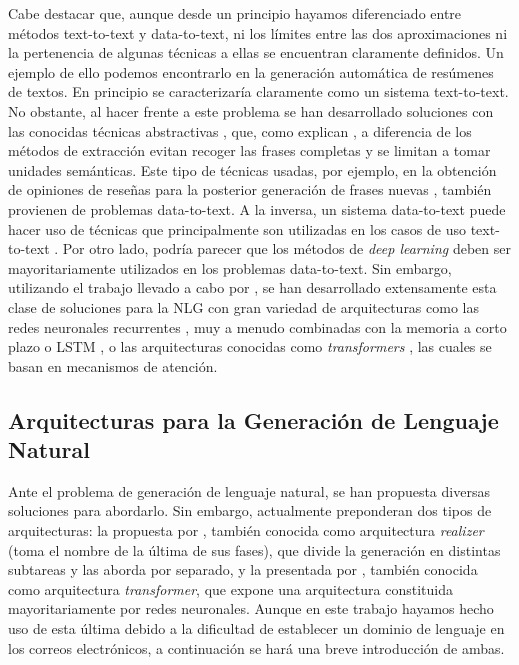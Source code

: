 Cabe destacar que, aunque desde un principio hayamos diferenciado entre métodos text-to-text y data-to-text, ni los límites entre las dos aproximaciones ni la pertenencia de algunas técnicas a ellas se encuentran claramente definidos. Un ejemplo de ello podemos encontrarlo en la generación automática de resúmenes de textos. En principio se caracterizaría claramente como un sistema text-to-text. No obstante, al hacer frente a este problema se han desarrollado soluciones con las conocidas técnicas abstractivas \citep{genest2011framework}, que, como explican \cite{hahn2000challenges}, a diferencia de los métodos de extracción evitan recoger las frases completas y se limitan a tomar unidades semánticas. Este tipo de técnicas usadas, por ejemplo, en la obtención de opiniones de reseñas para la posterior generación de frases nuevas \citep{labbe2012towards}, también provienen de problemas data-to-text. A la inversa, un sistema data-to-text puede hacer uso de técnicas que principalmente son utilizadas en los casos de uso text-to-text \citep{mcintyre2009learning, kondadadi2013statistical}. Por otro lado, podría parecer que los métodos de \textit{deep learning} \citep{goodfellow2016deep} deben ser mayoritariamente utilizados en los problemas data-to-text. Sin embargo, utilizando el trabajo llevado a cabo por \cite{mikolov2013efficient}, se han desarrollado extensamente esta clase de soluciones para la NLG con gran variedad de arquitecturas como las redes neuronales recurrentes \citep{cho2014learning, tang2016context}, muy a menudo combinadas con la memoria a corto plazo o LSTM \citep{chen2016enhanced}, o las arquitecturas conocidas como \textit{transformers} \citep{transformers}, las cuales se basan en mecanismos de atención.

\subsection{Arquitecturas para la Generación de Lenguaje Natural}\label{ss:arqnlg}
Ante el problema de generación de lenguaje natural, se han propuesta diversas soluciones para abordarlo. Sin embargo, actualmente preponderan dos tipos de arquitecturas: la propuesta por \cite{biblia}, también conocida como arquitectura \textit{realizer} (toma el nombre de la última de sus fases), que divide la generación en distintas subtareas y las aborda por separado, y la presentada por \cite{transformers}, también conocida como arquitectura \textit{transformer}, que expone una arquitectura constituida mayoritariamente por redes neuronales. Aunque en este trabajo hayamos hecho uso de esta última debido a la dificultad de establecer un dominio de lenguaje en los correos electrónicos, a continuación se hará una breve introducción de ambas.

